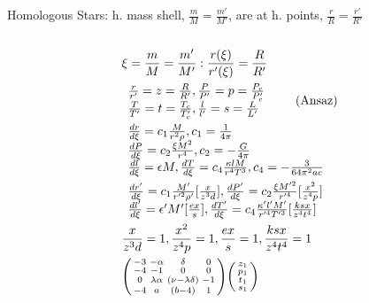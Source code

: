 \begin{frame}{Homologous Stars: h. mass shell, $\frac{m}{M}=\frac{m'}{M'}$, are at h. points, $\frac{r}{R}=\frac{r'}{R'}$}
    \begin{columns}[T]
        \begin{column}{0.50\textwidth}
            \begin{align*}
            &\xi=\frac{m}{M}=\frac{m'}{M'}: \frac{r(\xi)}{r'({\xi})}=\frac{R}{R'}\\
                &\begin{array}{l}
                \frac{r}{r'}=z=\frac{R}{R'},\frac{P}{P'}=p=\frac{P_c}{P_c'}\\
                \frac{T}{T'}=t=\frac{T_c}{T_c'},\frac{l}{l'}=s=\frac{L}{L'}
            \end{array}\tag{Ansaz}\\
            &\begin{array}{l}
                \TDy{\xi}{r}=c_1 \frac{M}{r^2\rho},c_1=\frac{1}{4\pi}\\
                \TDy{\xi}{P}=c_2 \frac{\xi M^2}{r^4},c_2=-\frac{G}{4\pi}\\
                \TDy{\xi}{l}=\epsilon M,\TDy{\xi}{T}=c_4 \frac{\kappa lM}{r^4T^3},c_4=-\frac{3}{64\pi^2ac}
            \end{array}\\
            &\begin{array}{l}
                \TDy{\xi}{r'}=c_1 \frac{M'}{r'^2\rho'}[\frac{x}{z^3d}],\TDy{\xi}{P'}=c_2 \frac{\xi M'^2}{r'^4}[\frac{x^2}{z^4p}]\\
                \TDy{\xi}{l'}=\epsilon'M'[\frac{ex}{s}],\TDy{\xi}{T'}=c_4 \frac{\kappa'l'M'}{r'^4T'^3}[\frac{ksx}{z^4t^4}]
            \end{array}\\
            &\frac{x}{z^3d}=1, \frac{x^2}{z^4p}=1, \frac{ex}{s}=1, \frac{ksx}{z^4t^4}=1\\
            &\begin{psmallmatrix}
                -3&-\alpha&\delta&0\\
                -4&-1&0&0\\
                0&\lambda\alpha&(\nu-\lambda\delta)&-1\\
                -4&a&(b-4)&1\\
            \end{psmallmatrix}
            \begin{psmallmatrix}
                z_1\\p_1\\t_1\\s_1\\

\end{psmallmatrix}
\end{align*}
\end{column}
\end{columns}
\end{frame}
